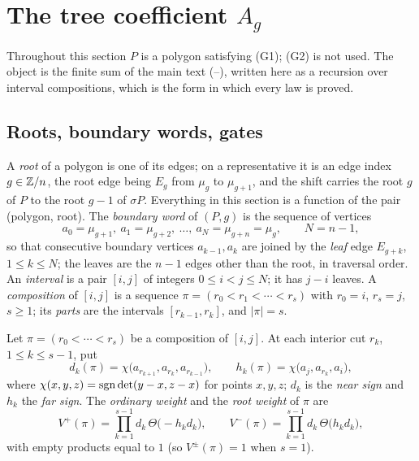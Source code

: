 \section{The tree coefficient \texorpdfstring{$A_g$}{A(g)}}\label{sec:amplitude}

Throughout this section $P$ is a polygon satisfying (G1); (G2) is not used.
The object is the finite sum of the main text (--), written
here as a recursion over interval compositions, which is the form in which
every law is proved.

\subsection{Roots, boundary words, gates}

\begin{definition}\label{def:root}
A \emph{root} of a polygon is one of its edges; on a representative it is an
edge index $g\in\mathbb Z/n$, the root edge being $E_g$ from $\mu_g$ to
$\mu_{g+1}$, and the shift carries the root $g$ of $P$ to the root $g-1$ of
$\sigma P$. Everything in this section is a function of the pair (polygon,
root). The \emph{boundary word} of $(P,g)$ is the sequence of
vertices
\[
a_0=\mu_{g+1},\ a_1=\mu_{g+2},\ \ldots,\ a_{N}=\mu_{g+n}=\mu_g,\qquad N=n-1,
\]
so that consecutive boundary vertices $a_{k-1},a_k$ are joined by the
\emph{leaf} edge $E_{g+k}$, $1\leq k\leq N$; the leaves are the $n-1$ edges
other than the root, in traversal order. An \emph{interval} is a pair
$[i,j]$ of integers $0\leq i<j\leq N$; it has $j-i$ leaves. A
\emph{composition} of $[i,j]$ is a sequence $\pi=(r_0<r_1<\cdots<r_s)$ with
$r_0=i$, $r_s=j$, $s\geq1$; its \emph{parts} are the intervals
$[r_{k-1},r_k]$, and $|\pi|=s$.
\end{definition}

\begin{definition}[gates]\label{def:gates}
Let $\pi=(r_0<\cdots<r_s)$ be a composition of $[i,j]$. At each interior cut
$r_k$, $1\leq k\leq s-1$, put
\[
d_k(\pi)=\chi\bigl(a_{r_{k+1}},a_{r_k},a_{r_{k-1}}\bigr),\qquad
h_k(\pi)=\chi\bigl(a_j,a_{r_k},a_i\bigr),
\]
where $\chi(x,y,z)=\operatorname{sgn}\det(y-x,z-x)$ for points $x,y,z$; $d_k$ is the
\emph{near sign} and $h_k$ the \emph{far sign}. The \emph{ordinary weight}
and the \emph{root weight} of $\pi$ are
\[
V^+(\pi)=\prod_{k=1}^{s-1}d_k\,\Theta\bigl(-h_kd_k\bigr),\qquad
V^-(\pi)=\prod_{k=1}^{s-1}d_k\,\Theta\bigl(h_kd_k\bigr),
\]
with empty products equal to $1$ (so $V^\pm(\pi)=1$ when $s=1$).
\end{definition}

